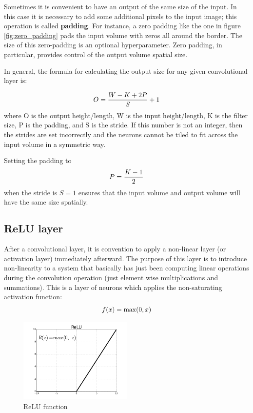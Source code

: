 Sometimes it is convenient to have an output of the same size of the input. In this case it is necessary to add some additional pixels to the input image; this operation is called \textbf{padding}. For instance, a zero padding like the one in figure \ref{fig:zero_padding} pads the input volume with zeros all around the border.
The size of this zero-padding is an optional hyperparameter. Zero padding, in particular, provides control of the output volume spatial size.

In general, the formula for calculating the output size for any given convolutional layer is:

\begin{equation} \notag
	O=\frac{W-K+2P}{S}+1
\end{equation}
where O is the output height/length, W is the input height/length, K is the filter size, P is the padding, and S is the stride. If this number is not an integer, then the strides are set incorrectly and the neurons cannot be tiled to fit across the input volume in a symmetric way.

Setting the padding to
\begin{equation} \notag
	P=\frac{K-1}{2}
\end{equation}
when the stride is $S=1$ ensures that the input volume and output volume will have the same size spatially.

\subsection{ReLU layer}

After a convolutional layer, it is convention to apply a non-linear layer (or activation layer) immediately afterward. The purpose of this layer is to introduce non-linearity to a system that basically has just been computing linear operations during the convolution operation (just element wise multiplications and summations). This is a layer of neurons which applies the non-saturating activation function:
\begin{equation} \notag
	f(x)=\max(0,x)
\end{equation}

\begin{figure}[!ht]
	\centering
	\includegraphics[width=0.5\textwidth]{Images/relu_function}
	\caption{\ac{ReLU} function}\label{fig:relu_function}
\end{figure}


